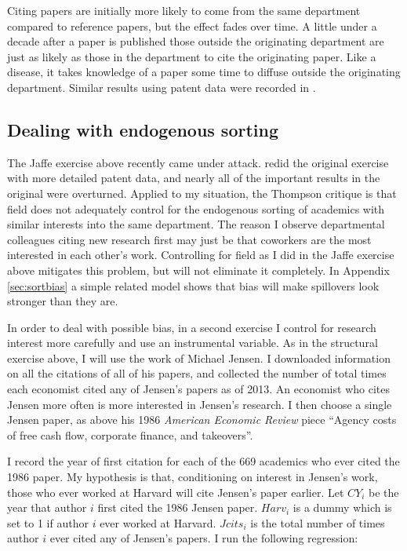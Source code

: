 Citing papers are initially more likely to come from the same department
compared to reference papers, but the effect fades over time. A little
under a decade after a paper is published those outside the originating
department are just as likely as those in the department to cite the
originating paper. Like a disease, it takes knowledge of a paper some
time to diffuse outside the originating department. Similar results
using patent data were recorded in \citet{jaffe1993geographic}.

\subsection{Dealing with endogenous sorting}

The Jaffe exercise above recently came under attack.
\citet{thompson2005patent} redid the original exercise with more
detailed patent data, and nearly all of the important results in the
original were overturned. Applied to my situation, the Thompson critique
is that field does not adequately control for the endogenous sorting of
academics with similar interests into the same department. The reason I
observe departmental colleagues citing new research first may just be
that coworkers are the most interested in each other's work. Controlling
for field as I did in the Jaffe exercise above mitigates this problem,
but will not eliminate it completely. In Appendix \ref{sec:sortbias} a simple
related model shows that bias will make spillovers look stronger than they are.

In order to deal with possible bias, in a second exercise I control for
research interest more carefully and use an instrumental variable.
As in the structural exercise above, I will use the work of Michael Jensen.
I downloaded information on all the
citations of all of his papers, and collected the number of total times
each economist cited any of Jensen's papers as of 2013. An economist who
cites Jensen more often is more interested in Jensen's research. I then
choose a single Jensen paper, as above his 1986 \emph{American Economic Review} piece
``Agency costs of free cash flow, corporate finance, and takeovers''.

I record the year of first citation for each of the 669 academics who
ever cited the 1986 paper. My hypothesis is that, conditioning on interest in
Jensen's work, those who ever worked at Harvard will cite Jensen's paper
earlier. Let $CY_i$ be the year that author $i$ first cited the 1986 Jensen paper.
$Harv_i$ is a dummy which is set to 1 if author $i$ ever worked at Harvard. 
$Jcits_i$ is the total number of times author $i$ ever cited any of Jensen's 
papers.  I run the following regression:

